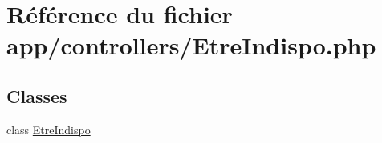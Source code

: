 \hypertarget{_etre_indispo_8php}{}\section{Référence du fichier app/controllers/\+Etre\+Indispo.php}
\label{_etre_indispo_8php}
\subsection*{Classes}
\begin{DoxyCompactItemize}
\item 
class \hyperlink{class_etre_indispo}{Etre\+Indispo}
\end{DoxyCompactItemize}
